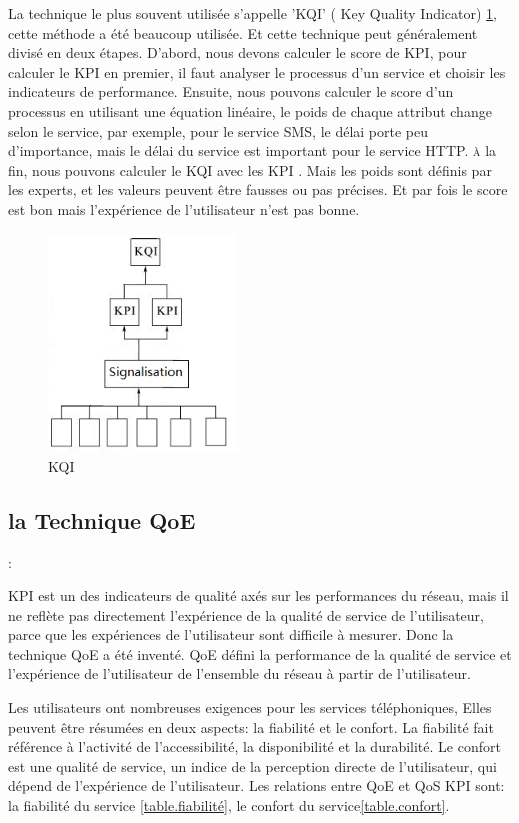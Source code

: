 La technique le plus souvent utilisée s'appelle 'KQI' ( Key Quality Indicator) \ref{fig:kqi}, cette méthode a été beaucoup utilisée. Et cette technique peut généralement divisé en deux étapes. D'abord, nous devons calculer le score de KPI, pour calculer le KPI en premier, il faut analyser le processus d'un service et choisir les indicateurs de performance. Ensuite, nous pouvons calculer le score d'un processus en utilisant une équation linéaire, le poids de chaque attribut change selon le service, par exemple, pour le service SMS, le délai porte peu d'importance, mais le délai du service est important pour le service HTTP. \textsc{à} la fin, nous pouvons calculer le KQI avec les KPI \cite{kqi}. Mais les poids sont définis par les experts, et les valeurs peuvent être fausses ou pas précises. Et par fois le score est bon mais l'expérience de l'utilisateur n'est pas bonne.
\begin{figure}[H]
\centering
\includegraphics[width=5cm]{images/kqi}
\caption{KQI}
\label{fig:kqi}
\end{figure}

\subsection{la Technique QoE}:

KPI est un des indicateurs de qualité axés sur les performances du réseau, mais il ne reflète pas directement l'expérience de la qualité de service de l'utilisateur, parce que les expériences de l'utilisateur sont difficile à mesurer. Donc la technique QoE a été inventé. QoE défini la performance de la qualité de service et l'expérience de l'utilisateur de l'ensemble du réseau à partir de l'utilisateur.

Les utilisateurs ont nombreuses exigences pour les services téléphoniques, Elles peuvent être résumées en deux aspects: la fiabilité et le confort. La fiabilité fait référence à l'activité de l'accessibilité, la disponibilité et la durabilité. Le confort est une qualité de service, un indice de la perception directe de l'utilisateur, qui dépend de l'expérience de l'utilisateur\cite{QoE}. Les relations entre QoE et QoS KPI sont: la fiabilité du service \ref{table.fiabilité}, le confort du service\ref{table.confort}. 

